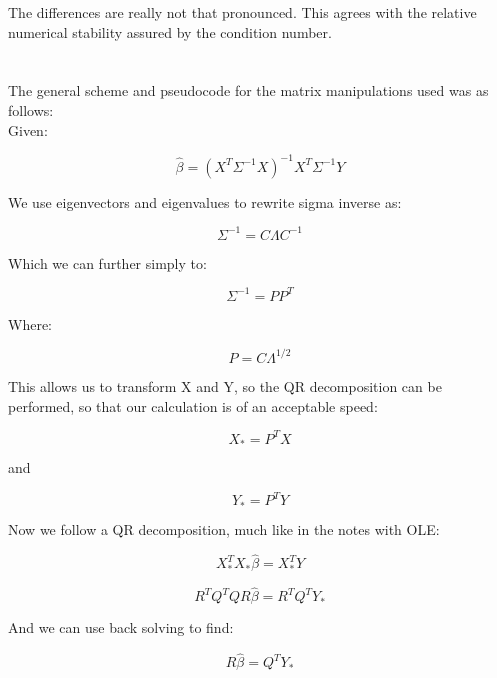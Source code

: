 \documentclass{article}\usepackage[]{graphicx}\usepackage[]{color}
\begin{document}
The differences are really not that pronounced.  This agrees with the relative numerical stability assured by the condition number.

\section{}

The general scheme and pseudocode for the matrix manipulations used was as follows:\\

Given:

\[ \hat{\beta} = \left( X^T \Sigma^{-1} X \right)^{-1} X^T \Sigma^{-1} Y \]

We use eigenvectors and eigenvalues to rewrite sigma inverse as:

\[ \Sigma^{-1} = C \Lambda C^{-1} \]

Which we can further simply to:

\[ \Sigma^{-1} = P P^T \]

Where:

\[ P = C \Lambda^{1/2} \]

This allows us to transform X and Y, so the QR decomposition can be performed, so that our calculation is of an acceptable speed:

\[X_* = P^T X\]

and

\[Y_* = P^T Y \]

Now we follow a QR decomposition, much like in the notes with OLE:

\[X_*^T X_* \hat \beta = X_*^T Y \]

\[R^T Q^T Q R \hat \beta = R^T Q^T Y_*\]

And we can use back solving to find:

\[ R \hat \beta = Q^T Y_* \]
\end{document}
